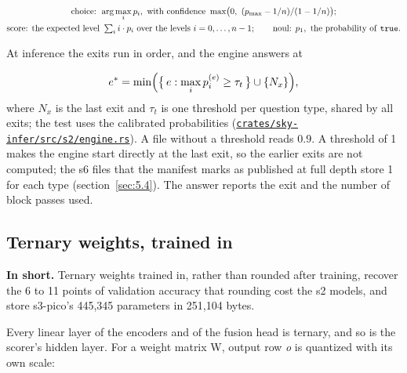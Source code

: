 \documentclass[10pt]{article}
\begin{document}
\begin{equation}\label{eq:3}
\begin{gathered}
\text{choice: } \arg\max_i p_i, \text{ with confidence } \max\bigl(0,\ (p_{\max} - 1/n)/(1 - 1/n)\bigr);\\
\text{score: the expected level } \textstyle\sum_i i \cdot p_i \text{ over the levels } i = 0, \dots, n - 1; \qquad \text{noul: } p_1, \text{ the probability of \texttt{true}.}
\end{gathered}
\end{equation}

At inference the exits run in order, and the engine answers at

\begin{equation}\label{eq:4}
e^{*} = \min\Bigl(\bigl\{\, e : \max_i p^{(e)}_i \geq \tau_t \,\bigr\} \cup \{N_x\}\Bigr),
\end{equation}
where $N_x$ is the last exit and $\tau_{t}$ is one threshold per question type, shared by all exits; the test uses the calibrated probabilities (\href{https://github.com/maxgfr/skycmd/blob/main/crates/sky-infer/src/s2/engine.rs}{\texttt{crates/\allowbreak{}sky-infer/\allowbreak{}src/\allowbreak{}s2/\allowbreak{}engine.rs}}). A file without a threshold reads 0.9. A threshold of 1 makes the engine start directly at the last exit, so the earlier exits are not computed; the s6 files that the manifest marks as published at full depth store 1 for each type (section~\ref{sec:5.4}). The answer reports the exit and the number of block passes used.

\subsection{Ternary weights, trained in}\label{sec:3.6}

\textbf{In short.} Ternary weights trained in, rather than rounded after training, recover the 6 to 11 points of validation accuracy that rounding cost the s2 models, and store s3-pico's 445,345 parameters in 251,104 bytes.

Every linear layer of the encoders and of the fusion head is ternary, and so is the scorer's hidden layer. For a weight matrix W, output row \emph{o} is quantized with its own scale:
\end{document}
